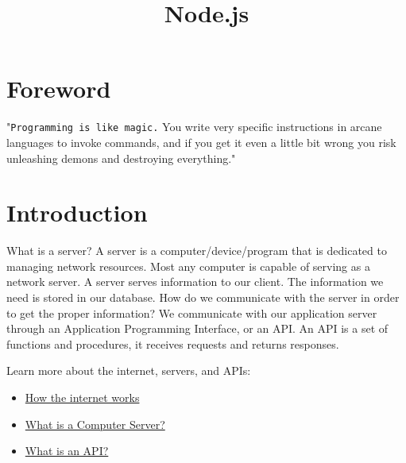 \documentclass{42-en}
\begin{document}
\title{Node.js}
\maketitle

\tableofcontents


\chapter{Foreword}

"\texttt{Programming is like magic.} You write very specific instructions in arcane languages to invoke commands, and if you get it even a little bit wrong you risk unleashing demons and destroying everything."


\chapter{Introduction}

What is a server? A server is a computer/device/program that is dedicated to managing network resources. Most any computer is capable of serving as a network server. A server serves information to our client. The information we need is stored in our database. How do we communicate with the server in order to get the proper information? We communicate with our application server through an Application Programming Interface, or an API. An API is a set of functions and procedures, it receives requests and returns responses.

Learn more about the internet, servers, and APIs:
\begin{itemize}\itemsep1pt
\item \href{https://www.youtube.com/watch?v=ZhEf7e4kopM&list=PLzdnOPI1iJNfMRZm5DDxco3UdsFegvuB7&index=2}{How the internet works}
\item \href{https://www.youtube.com/watch?v=TQQA8RpKxqg}{What is a Computer Server?}
\item \href{https://www.youtube.com/watch?v=s7wmiS2mSXY}{What is an API?}
\end{itemize}
\end{document}

